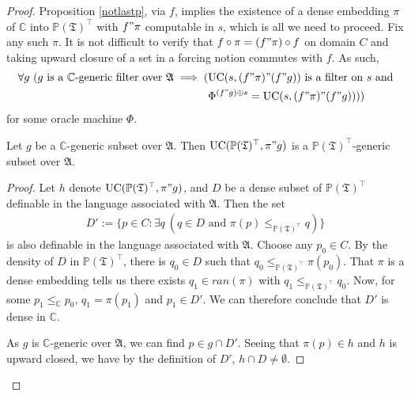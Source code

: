 \documentclass[12pt]{article}
\numberwithin{equation}{section}
\begin{document}
\begin{proof}
Proposition \ref{notlastp}, via $f$, implies the existence of a dense embedding $\pi$ of $\mathbb{C}$ into $\mathbb{P}(\mathfrak{T})^{\top}$ with $f" \pi$ computable in $s$, which is all we need to proceed. Fix any such $\pi$. It is not difficult to verify that $f \circ \pi = (f" \pi) \circ f$ on domain $C$ and taking upward closure of a set in a forcing notion commutes with $f$. As such, 
\begin{align}\label{number8}
\begin{split}
    \forall g \ (g \text{ is a } \mathbb{C} \text{-generic filter over } \mathfrak{A} \implies ( & \mathrm{UC}(s, (f" \pi)" (f" g)) \text{ is a filter on } s \text{ and} \\
    & \Phi^{(f" g) \oplus s} = \mathrm{UC}(s, (f" \pi)" (f" g))))
\end{split}
\end{align}
for some oracle machine $\Phi$.

\begin{prop}\label{lastprop0}
Let $g$ be a $\mathbb{C}$-generic subset over $\mathfrak{A}$. Then $\mathrm{UC}(\mathbb{P}(\mathfrak{T})^{\top}, \pi" g)$ is a $\mathbb{P}(\mathfrak{T})^{\top}$-generic subset over $\mathfrak{A}$.
\end{prop}

\begin{proof}
Let $h$ denote $\mathrm{UC}(\mathbb{P}(\mathfrak{T})^{\top}, \pi" g)$, and $D$ be a dense subset of $\mathbb{P}(\mathfrak{T})^{\top}$ definable in the language associated with $\mathfrak{A}$. Then the set
\begin{align*}
    D' := \{p \in C : \exists q \ (q \in D \text{ and } \pi(p) \leq_{\mathbb{P}(\mathfrak{T})^{\top}} q)\}
\end{align*}
is also definable in the language associated with $\mathfrak{A}$. Choose any $p_0 \in C$. By the density of $D$ in $\mathbb{P}(\mathfrak{T})^{\top}$, there is $q_0 \in D$ such that $q_0 \leq_{\mathbb{P}(\mathfrak{T})^{\top}} \pi(p_0)$. That $\pi$ is a dense embedding tells us there exists $q_1 \in ran(\pi)$ with $q_1 \leq_{\mathbb{P}(\mathfrak{T})^{\top}} q_0$. Now, for some $p_1 \leq_{\mathbb{C}} p_0$, $q_1 = \pi(p_1)$ and $p_1 \in D'$. We can therefore conclude that $D'$ is dense in $\mathbb{C}$.

As $g$ is $\mathbb{C}$-generic over $\mathfrak{A}$, we can find $p \in g \cap D'$. Seeing that $\pi(p) \in h$ and $h$ is upward closed, we have by the definition of $D'$, $h \cap D \neq \emptyset$.
\end{proof}


\end{proof}
\end{document}
